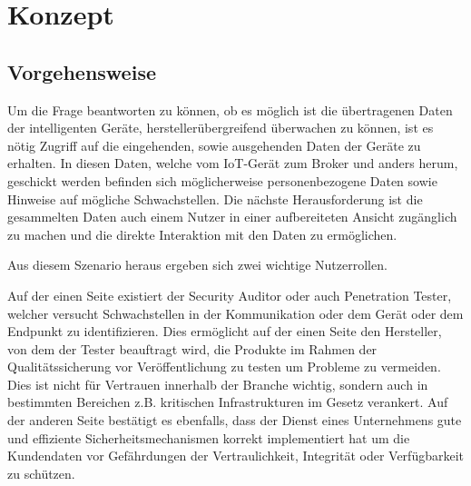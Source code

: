 \chapter{Konzept}
\section{Vorgehensweise}
    Um die Frage beantworten zu können, ob es möglich ist die übertragenen Daten der intelligenten Geräte, herstellerübergreifend überwachen zu können, ist es nötig Zugriff auf die eingehenden, sowie ausgehenden Daten der Geräte zu erhalten. In diesen Daten, welche vom \ac{IoT}-Gerät zum Broker und anders herum, geschickt werden befinden sich möglicherweise personenbezogene Daten sowie Hinweise auf mögliche Schwachstellen.
    Die nächste Herausforderung ist die gesammelten Daten auch einem Nutzer in einer aufbereiteten Ansicht zugänglich zu machen und die direkte Interaktion mit den Daten zu ermöglichen.
    
    Aus diesem Szenario heraus ergeben sich zwei wichtige Nutzerrollen.
    
    Auf der einen Seite existiert der Security Auditor oder auch Penetration Tester, welcher versucht Schwachstellen in der Kommunikation oder dem Gerät oder dem Endpunkt zu identifizieren.
    Dies ermöglicht auf der einen Seite den Hersteller, von dem der Tester beauftragt wird, die Produkte im Rahmen der Qualitätssicherung vor Veröffentlichung zu testen um Probleme zu vermeiden. Dies ist nicht für Vertrauen innerhalb der Branche wichtig, sondern auch in bestimmten Bereichen z.B. kritischen Infrastrukturen im Gesetz verankert.
    Auf der anderen Seite bestätigt es ebenfalls, dass der Dienst eines Unternehmens gute und effiziente Sicherheitsmechanismen korrekt implementiert hat um die Kundendaten vor Gefährdungen der Vertraulichkeit, Integrität oder Verfügbarkeit zu schützen.
    

